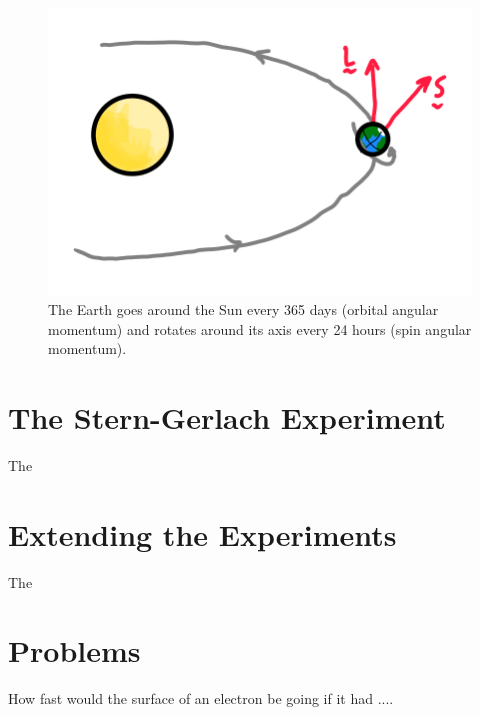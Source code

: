 \begin{figure}
\centering\includegraphics[width=0.5\linewidth]{Figures/Chapter 1/fig_sun_earth.png}
\caption{The Earth goes around the Sun every 365 days (orbital angular momentum) and rotates around its axis every 24 hours (spin angular momentum).}
\label{fig_sun_earth}
\end{figure}

%
%
%

\section{The Stern-Gerlach Experiment}

The 

%
%
%

\section{Extending the Experiments}

The 

%
%
%



\section*{Problems}
%

\begin{problem}
How fast would the surface of an electron be going if it had ....
\end{problem}

